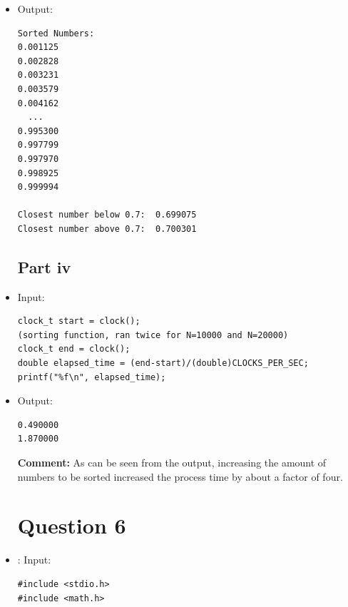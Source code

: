 \documentclass[10pt]{article}
\begin{document}
\begin{itemize}
\begin{verbatim}
        //Uses the bisection method until element numbers of the array differ by one around 0.7
        while(x_h - x_l > 1)
        {
                mid = (x_h + x_l) / 2;

                if (x[mid] < 0.7)
                        x_l = mid + 1;

                else if(x[mid] > 0.7)
                        x_h = mid - 1;
        }

          /*+= 1 in printf statements take into account that the above while statement runs 
            one more time than needed before terminating*/
          printf("Closest number below 0.7:  %f \n", x[x_l - 1]); 
          printf("Closest number above 0.7:  %f \n", x[x_h + 1]);	

return 0;
}
\end{verbatim}
\item Output:
\begin{verbatim}
Sorted Numbers:
0.001125
0.002828
0.003231
0.003579
0.004162
  ...  
0.995300
0.997799
0.997970
0.998925
0.999994

Closest number below 0.7:  0.699075 
Closest number above 0.7:  0.700301 
\end{verbatim}


\subsection*{Part iv}
\item Input:
\begin{verbatim}
clock_t start = clock();
(sorting function, ran twice for N=10000 and N=20000)
clock_t end = clock();
double elapsed_time = (end-start)/(double)CLOCKS_PER_SEC;
printf("%f\n", elapsed_time);
\end{verbatim}
\item Output:
\begin{verbatim}
0.490000
1.870000
\end{verbatim}

\textbf{Comment:} As can be seen from the output, increasing the amount of numbers to be sorted increased the process time by about a factor of four. 

\section*{Question 6}
\item: Input:
\begin{verbatim}
#include <stdio.h>
#include <math.h>



\end{verbatim}
\end{itemize}
\end{document}
